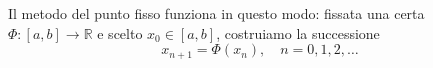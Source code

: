 \documentclass[a4paper]{report}
\DeclarePairedDelimiter{\abs}{\lvert}{\rvert}
\theoremstyle{definiton}
\theoremstyle{remark}
\begin{document}
Il metodo del punto fisso funziona in questo modo: fissata una certa $\Phi:[a,b] \to \mathbb{R}$ e scelto $x_0 \in [a,b]$, costruiamo la successione
\begin{equation} \label{puntofisso}
    x_{n+1} = \Phi(x_n), \quad n=0,1,2,\dots    
\end{equation}


\end{document}
